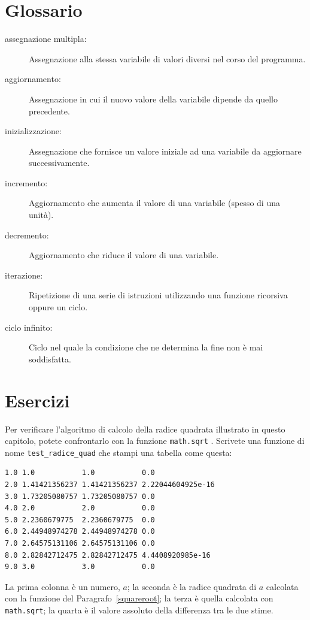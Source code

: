 \documentclass[10pt]{book}
\begin{document}
\section{Glossario}

\begin{description}

\item[assegnazione multipla:] Assegnazione alla stessa variabile di valori diversi nel corso del programma.

\item[aggiornamento:] Assegnazione in cui il nuovo valore della variabile dipende da quello precedente.

\item[inizializzazione:] Assegnazione che fornisce un valore iniziale ad una variabile da aggiornare successivamente.

\item[incremento:] Aggiornamento che aumenta il valore di una variabile (spesso di una unità).

\item[decremento:] Aggiornamento che riduce il valore di una variabile.

\item[iterazione:] Ripetizione di una serie di istruzioni utilizzando una funzione ricorsiva oppure un ciclo.

\item[ciclo infinito:] Ciclo nel quale la condizione che ne determina la fine non è mai soddisfatta.

\end{description}


\section{Esercizi}

\begin{exercise}

Per verificare l'algoritmo di calcolo della radice quadrata illustrato in questo capitolo, potete confrontarlo con la funzione {\tt math.sqrt} . Scrivete una funzione di nome \verb"test_radice_quad" che stampi una tabella come questa:

\begin{verbatim}
1.0 1.0           1.0           0.0
2.0 1.41421356237 1.41421356237 2.22044604925e-16
3.0 1.73205080757 1.73205080757 0.0
4.0 2.0           2.0           0.0
5.0 2.2360679775  2.2360679775  0.0
6.0 2.44948974278 2.44948974278 0.0
7.0 2.64575131106 2.64575131106 0.0
8.0 2.82842712475 2.82842712475 4.4408920985e-16
9.0 3.0           3.0           0.0

\end{verbatim}
%
La prima colonna è un numero, $a$; la seconda è la radice quadrata di $a$ calcolata con la funzione del Paragrafo~\ref{squareroot}; la terza è quella calcolata con {\tt math.sqrt}; la quarta è il valore assoluto della differenza tra le due stime.
\end{exercise}
\end{document}
